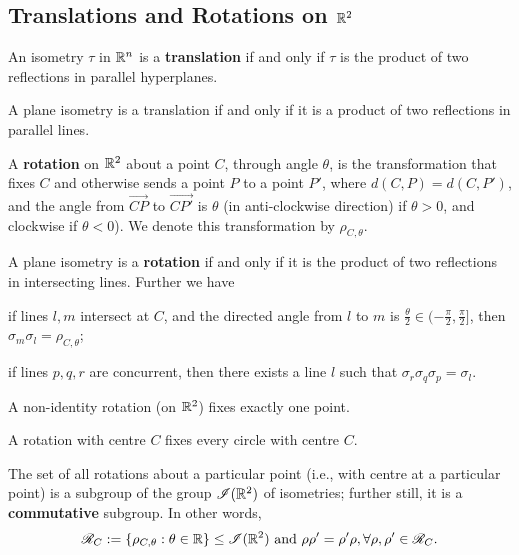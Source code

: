 \subsection{Translations and Rotations on \(\mathbb{R}^2\)}

\begin{theorem}
    An isometry \(\tau\) in \(\mathbb{R}^n\) is a \textbf{translation} if and only if \(\tau\) is the product of two reflections in parallel hyperplanes.
\end{theorem}

\begin{corollary}
    A plane isometry is a translation if and only if it is a product of two reflections in parallel lines.
\end{corollary}

\begin{definition}
    A \textbf{rotation} on \(\mathbb{R}^2\) about a point \(C\), through angle \(\theta\), is the transformation that fixes \(C\) and otherwise sends a point \(P\) to a point \(P'\), where \(d(C, P) = d(C, P')\), and the angle from \(\vec{CP}\) to \(\vec{CP'}\) is \(\theta\) (in anti-clockwise direction) if \(\theta > 0\), and clockwise if \(\theta < 0\)). We denote this transformation by \(\rho_{C, \theta}\).
\end{definition}

\begin{theorem}
    A plane isometry is a \textbf{rotation} if and only if it is the product of two reflections in intersecting lines. Further we have
    \begin{statements}{}
        \item if lines \(l, m\) intersect at \(C\), and the directed angle from \(l\) to \(m\) is \(\frac{\theta}{2} \in (-\frac{\pi}{2}, \frac{\pi}{2}]\), then \(\sigma_m \sigma_l = \rho_{C, \theta}\);
        \item if lines \(p, q, r\) are concurrent, then there exists a line \(l\) such that \(\sigma_r \sigma_q \sigma_p = \sigma_l\).
    \end{statements}
\end{theorem}

\begin{corollary}
    \begin{statements}{}
        \item A non-identity rotation (on \(\mathbb{R}^2\)) fixes exactly one point.
        \item A rotation with centre \(C\) fixes every circle with centre \(C\).
        \item The set of all rotations about a particular point (i.e., with centre at a particular point) is a subgroup of the group \(\mathscr{I}(\mathbb{R}^2)\) of isometries; further still, it is a \textbf{commutative} subgroup. In other words,
        \[\mathscr{R}_C := \{\rho_{C, \theta} : \theta \in \mathbb{R} \} \leq \mathscr{I}(\mathbb{R}^2) \text{ and } \rho\rho' = \rho'\rho, \forall \rho, \rho' \in \mathscr{R}_C.\]
    \end{statements}
\end{corollary}

